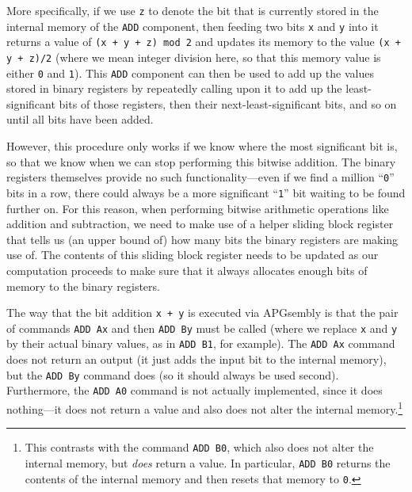 More specifically, if we use \texttt{z} to denote the bit that is currently stored in the internal memory of the \texttt{ADD} component, then feeding two bits \texttt{x} and \texttt{y} into it returns a value of \texttt{(x + y + z) mod 2} and updates its memory to the value \texttt{(x + y + z)/2} (where we mean integer division here, so that this memory value is either \texttt{0} and \texttt{1}). This \texttt{ADD} component can then be used to add up the values stored in binary registers by repeatedly calling upon it to add up the least-significant bits of those registers, then their next-least-significant bits, and so on until all bits have been added.

However, this procedure only works if we know where the most significant bit is, so that we know when we can stop performing this bitwise addition. The binary registers themselves provide no such functionality---even if we find a million ``\texttt{0}'' bits in a row, there could always be a more significant ``\texttt{1}'' bit waiting to be found further on. For this reason, when performing bitwise arithmetic operations like addition and subtraction, we need to make use of a helper sliding block register that tells us (an upper bound of) how many bits the binary registers are making use of. The contents of this sliding block register needs to be updated as our computation proceeds to make sure that it always allocates enough bits of memory to the binary registers.

The way that the bit addition \texttt{x + y} is executed via APGsembly is that the pair of commands \texttt{ADD~Ax} and then \texttt{ADD~By} must be called (where we replace \texttt{x} and \texttt{y} by their actual binary values, as in \texttt{ADD B1}, for example). The \texttt{ADD Ax} command does not return an output (it just adds the input bit to the internal memory), but the \texttt{ADD By} command does (so it should always be used second). Furthermore, the \texttt{ADD A0} command is not actually implemented, since it does nothing---it does not return a value and also does not alter the internal memory.\footnote{This contrasts with the command \texttt{ADD B0}, which also does not alter the internal memory, but \emph{does} return a value. In particular, \texttt{ADD B0} returns the contents of the internal memory and then resets that memory to \texttt{0}.}

